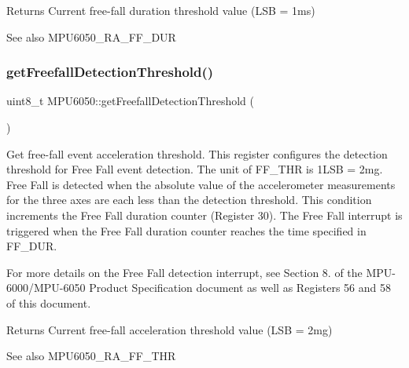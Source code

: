 \begin{DoxyReturn}{Returns}
Current free-\/fall duration threshold value (L\+SB = 1ms) 
\end{DoxyReturn}
\begin{DoxySeeAlso}{See also}
M\+P\+U6050\+\_\+\+R\+A\+\_\+\+F\+F\+\_\+\+D\+UR 
\end{DoxySeeAlso}
\mbox{\label{class_m_p_u6050_ac7f5c0511fe9d0f3525a3757498daed7}} 
\subsubsection{\texorpdfstring{getFreefallDetectionThreshold()}{getFreefallDetectionThreshold()}}
{\footnotesize\ttfamily uint8\+\_\+t M\+P\+U6050\+::get\+Freefall\+Detection\+Threshold (\begin{DoxyParamCaption}{ }\end{DoxyParamCaption})}

Get free-\/fall event acceleration threshold. This register configures the detection threshold for Free Fall event detection. The unit of F\+F\+\_\+\+T\+HR is 1L\+SB = 2mg. Free Fall is detected when the absolute value of the accelerometer measurements for the three axes are each less than the detection threshold. This condition increments the Free Fall duration counter (Register 30). The Free Fall interrupt is triggered when the Free Fall duration counter reaches the time specified in F\+F\+\_\+\+D\+UR.

For more details on the Free Fall detection interrupt, see Section 8. of the M\+P\+U-\/6000/\+M\+P\+U-\/6050 Product Specification document as well as Registers 56 and 58 of this document.

\begin{DoxyReturn}{Returns}
Current free-\/fall acceleration threshold value (L\+SB = 2mg) 
\end{DoxyReturn}
\begin{DoxySeeAlso}{See also}
M\+P\+U6050\+\_\+\+R\+A\+\_\+\+F\+F\+\_\+\+T\+HR 
\end{DoxySeeAlso}
\mbox{\label{class_m_p_u6050_a4c01f9ab83b64dbbc6b62e658c3d3d9b}} 
